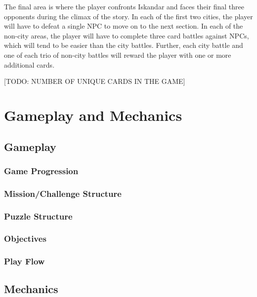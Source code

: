 \documentclass[12pt,titlepage]{article}
\newcommand\evilcorp{Iskandar\xspace}
\begin{document}
The final area is where the player confronts \evilcorp and faces their final
three opponents during the climax of the story. In each of the first two cities,
the player will have to defeat a single NPC to move on to the next section. In
each of the non-city areas, the player will have to complete three card battles
against NPCs, which will tend to be easier than the city battles. Further, each
city battle and one of each trio of non-city battles will reward the player with
one or more additional cards.

[TODO: NUMBER OF UNIQUE CARDS IN THE GAME]

\newpage
\section{Gameplay and Mechanics}

\subsection{Gameplay}

\subsubsection{Game Progression}

\subsubsection{Mission/Challenge Structure}

\subsubsection{Puzzle Structure}

\subsubsection{Objectives}

\subsubsection{Play Flow}

\subsection{Mechanics}
\end{document}
